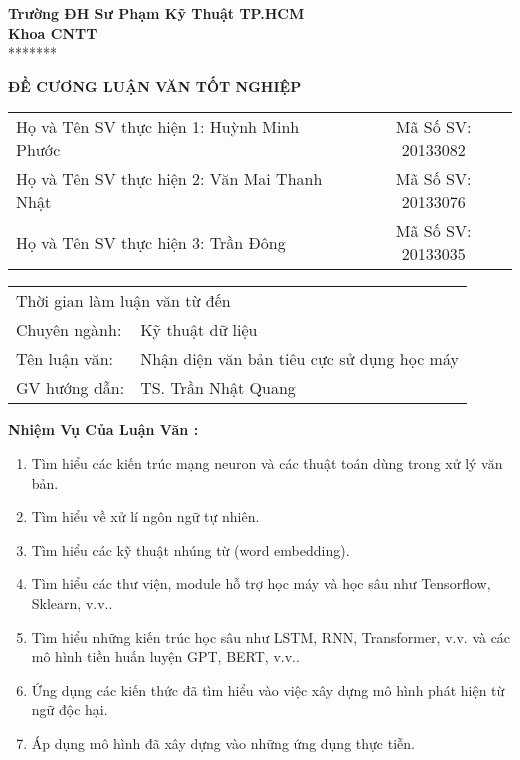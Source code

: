 
\noindent\begin{minipage}[t]{0.43\textwidth}
    \centering
    \fontsize{11pt}{16.5pt}
    \textbf{Trường ĐH Sư Phạm Kỹ Thuật TP.HCM}\\
    \textbf{Khoa CNTT}\\
    *******
\end{minipage}

\begin{center}
    \fontsize{18pt}{27pt}
    \textbf{ĐỀ CƯƠNG LUẬN VĂN TỐT NGHIỆP}
\end{center}

\begin{table}[!h]
    \centering
    \begin{tabularx}{0.8\textwidth}{ X c }
        Họ và Tên SV thực hiện 1: Huỳnh Minh Phước   & Mã Số SV: 20133082 \\
        Họ và Tên SV thực hiện 2: Văn Mai Thanh Nhật & Mã Số SV: 20133076 \\
        Họ và Tên SV thực hiện 3: Trần Đông          & Mã Số SV: 20133035 \\
    \end{tabularx}
\end{table}

\begin{center}
    \begin{tabular}{p{} p{}}
        \multicolumn{2}{l}{Thời gian làm luận văn từ\hspace{3cm} đến} \\
        Chuyên ngành: & Kỹ thuật dữ liệu                              \\
        Tên luận văn: & Nhận diện văn bản tiêu cực sử dụng học máy    \\
        GV hướng dẫn: & TS. Trần Nhật Quang
    \end{tabular}
\end{center}

\textbf{Nhiệm Vụ Của Luận Văn :}
\begin{enumerate}
    \item Tìm hiểu các kiến trúc mạng neuron và các thuật toán dùng trong xử lý văn bản.
    \item Tìm hiểu về xử lí ngôn ngữ tự nhiên.
    \item Tìm hiểu các kỹ thuật nhúng từ (word embedding).
    \item Tìm hiểu các thư viện, module hỗ trợ học máy và học sâu như Tensorflow, Sklearn, v.v..
    \item Tìm hiểu những kiến trúc học sâu như LSTM, RNN, Transformer, v.v. và các mô hình tiền huấn luyện GPT, BERT, v.v..
    \item Ứng dụng các kiến thức đã tìm hiểu vào việc xây dựng mô hình phát hiện từ ngữ độc hại.
    \item Áp dụng mô hình đã xây dựng vào những ứng dụng thực tiễn.
\end{enumerate}


